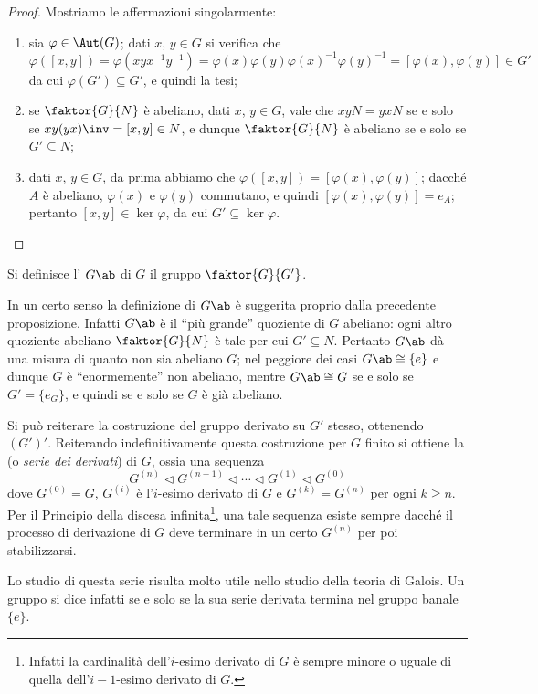 \documentclass[11pt]{scrartcl}
\begin{document}
	\begin{proof}
		Mostriamo le affermazioni singolarmente:
		\begin{enumerate}[(1)]
			\item sia $\varphi \in \Aut(G)$; dati $x$, $y \in G$ si verifica che
			\[
			\varphi([x, y]) = \varphi(xyx^{-1}y^{-1}) = \varphi(x)\varphi(y)
			\varphi(x)^{-1}\varphi(y)^{-1} = [\varphi(x), \varphi(y)] \in G'
			\]da cui $\varphi(G') \subseteq G'$, e quindi la tesi;
			\item se $\faktor{G}{N}$ è abeliano, dati $x$, $y \in G$, vale che $xyN = yxN$
			se e solo se $xy(yx)\inv = [x, y] \in N$, e dunque $\faktor{G}{N}$ è abeliano
			se e solo se $G' \subseteq N$;
			\item dati $x$, $y \in G$, da prima abbiamo che $\varphi([x, y]) = [\varphi(x), \varphi(y)]$; dacché $A$ è abeliano, $\varphi(x)$ e $\varphi(y)$ commutano,
			e quindi $[\varphi(x), \varphi(y)] = e_A$; pertanto $[x, y] \in \ker \varphi$,
			da cui $G' \subseteq \ker \varphi$.
		\end{enumerate}
	\end{proof}
	
	\begin{definition}
		Si definisce l' $G\ab$ di $G$ il gruppo
		$\faktor{G}{G'}$.
	\end{definition}
	
	\begin{remark}
		In un certo senso la definizione di $G\ab$ è suggerita proprio dalla precedente
		proposizione. Infatti $G\ab$ è il ``più grande'' quoziente di $G$ abeliano:
		ogni altro quoziente abeliano $\faktor{G}{N}$ è tale per cui $G' \subseteq N$.
		Pertanto $G\ab$ dà una misura di quanto non sia abeliano $G$; nel peggiore dei
		casi $G\ab \cong \{e\}$ e dunque $G$ è ``enormemente'' non abeliano, mentre $G\ab \cong G$
		se e solo se $G' = \{e_G\}$, e quindi se e solo se $G$ è già abeliano.
	\end{remark}
	
	\begin{remark}
		Si può reiterare la costruzione del gruppo derivato su $G'$ stesso, ottenendo
		$(G')'$. Reiterando indefinitivamente questa costruzione per $G$ finito
		si ottiene la
		 (o \textit{serie dei derivati}) di $G$, ossia una sequenza
		\[ G^{(n)} \triangleleft G^{(n-1)} \triangleleft \cdots \triangleleft G^{(1)} \triangleleft G^{(0)} \]
		dove $G^{(0)} = G$, $G^{(i)}$ è l'$i$-esimo derivato di $G$ e $G^{(k)} = G^{(n)}$ per
		ogni $k \geq n$. Per il Principio della
		discesa infinita\footnote{Infatti la cardinalità dell'$i$-esimo derivato di $G$ è sempre minore o uguale di quella dell'$i-1$-esimo derivato di $G$.}, una tale sequenza esiste sempre dacché il processo di derivazione di $G$ deve terminare in un certo $G^{(n)}$ per
		poi stabilizzarsi. \medskip
		
		
		Lo studio di questa serie risulta molto utile nello studio della teoria di Galois.
		Un gruppo si dice infatti  se e solo se la sua serie derivata termina
		nel gruppo banale $\{ e \}$.
	\end{remark}
	
\end{document}
